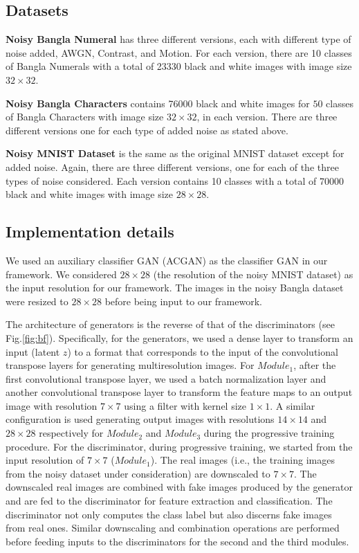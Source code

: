 \documentclass[runningheads]{llncs}
\begin{document}
\subsection{Datasets}

\textbf{Noisy Bangla Numeral} has three different versions, each with different type of noise added, AWGN, Contrast, and Motion. For each version, there are 10 classes of Bangla Numerals with a total of 23330 black  and white images with image size $32\times32$.

\textbf{Noisy Bangla Characters} contains 76000 black  and white images for $50$ classes of Bangla Characters with image size $32\times32$, in each version. There are  three different versions one for each type of added noise as stated above.

\textbf{Noisy MNIST Dataset} is the  same as the  original MNIST dataset except  for added noise. Again, there are three different versions, one for each of the three types of noise considered.  Each version  contains 10 classes with a total of 70000 black and  white images with image size $28\times28$.

\subsection{Implementation details}


We used an  auxiliary classifier GAN (ACGAN) \cite{google} as the classifier GAN in our framework.  We considered $28\times28$ (the resolution of the noisy MNIST dataset)  as the input resolution for our framework.  The images in the noisy Bangla  dataset were resized to $28 \times 28$ before being input to our framework. 


The architecture of generators is the reverse of that of the discriminators (see Fig.\ref{fig:bf}).  
Specifically, for  the generators, we used a dense layer to transform an input (latent $z$) to  a  format that corresponds to the input of the  convolutional transpose layers for generating multiresolution images. For $\mathit{Module}_1$,  after the first convolutional transpose layer, we used a batch normalization layer and another convolutional transpose layer to transform  the feature maps to an output image with resolution  $7\times7$ using a filter with kernel size $1\times1$. A similar configuration is used  generating output images with resolutions  $14\times14$ and $28\times28$  respectively for $\mathit{Module}_2$ and $\mathit{Module}_3$ during the  progressive training procedure. For the discriminator, during progressive training, we started from the input resolution of $7\times7$ ($\mathit{Module}_1$).  The real images (i.e., the training images from the noisy dataset under consideration) are downscaled to $7 \times 7$.      The downscaled  real images are combined   with fake images  produced by the  generator and are fed to the discriminator for feature extraction and classification. The discriminator not only computes the class label but also discerns fake images from real ones. Similar downscaling and combination operations are performed before feeding  inputs to the discriminators for the second and the third modules. 
\end{document}
